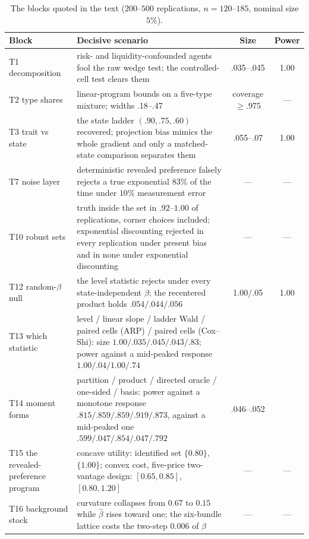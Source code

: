 \documentclass[11pt,a4paper]{article}
\theoremstyle{plain}
\theoremstyle{definition}
\begin{document}
\begin{table}[!ht]\centering
\caption{The blocks quoted in the text ($200$--$500$ replications, $n=120$--$185$, nominal size $5\%$).}
\label{tab:mc}
{\small
\begin{tabular}{>{\raggedright\arraybackslash}p{3.0cm}>{\raggedright\arraybackslash}p{7.6cm}cc}
\toprule
Block & Decisive scenario & Size & Power \\
\midrule
T1 decomposition & risk- and liquidity-confounded agents fool the raw wedge test; the controlled-cell test clears them & .035--.045 & 1.00 \\
T2 type shares & linear-program bounds on a five-type mixture; widths .18--.47 & coverage $\ge.975$ & --- \\
T3 trait vs state & the state ladder $(.90,.75,.60)$ recovered; projection bias mimics the whole gradient and only a matched-state comparison separates them & .055--.07 & 1.00 \\
T7 noise layer & deterministic revealed preference falsely rejects a true exponential $83\%$ of the time under $10\%$ measurement error & --- & --- \\
T10 robust sets & truth inside the set in $.92$--$1.00$ of replications, corner choices included; exponential discounting rejected in every replication under present bias and in none under exponential discounting & --- & --- \\
T12 random-$\beta$ null & the level statistic rejects under every state-independent $\beta$; the recentered product holds $.054/.044/.056$ & 1.00/.05 & 1.00 \\
T13 which statistic & level / linear slope / ladder Wald / paired cells (ARP) / paired cells (Cox--Shi): size $1.00/.035/.045/.043/\mathbf{.83}$; power against a mid-peaked response $1.00/.04/1.00/.74$ & & \\
T14 moment forms & partition / product / directed oracle / one-sided / basis: power against a monotone response $.815/.859/.859/.919/.873$, against a mid-peaked one $.599/.047/.854/.047/.792$ & .046--.052 & \\
T15 the revealed-preference program & concave utility: identified set $\{0.80\}$, $\{1.00\}$; convex cost, five-price two-vantage design: $[0.65,0.85]$, $[0.80,1.20]$ & --- & --- \\
T16 background stock & curvature collapses from $0.67$ to $0.15$ while $\hat\beta$ rises toward one; the six-bundle lattice costs the two-step $0.006$ of $\beta$ & --- & --- \\
\bottomrule
\end{tabular}}
\end{table}
\end{document}
